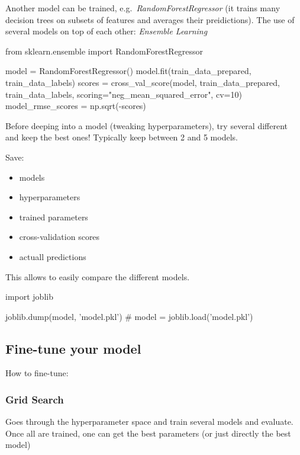 \documentclass{article}
\begin{document}
    Another model can be trained, e.g.\ \emph{RandomForestRegressor} (it trains many decision trees on subsets of features and averages their preidictions).
    The use of several models on top of each other: \emph{Ensemble Learning}
    \begin{python}
        from sklearn.ensemble import RandomForestRegressor

        model = RandomForestRegressor()
        model.fit(train_data_prepared, train_data_labels)
        scores = cross_val_score(model, train_data_prepared, train_data_labels,
                    scoring="neg_mean_squared_error", cv=10)
        model_rmse_scores = np.sqrt(-scores)
    \end{python}

    Before deeping into a model (tweaking hyperparameters), try several different and keep the best ones!
    Typically keep between 2 and 5 models.

    Save:
    \begin{itemize}
        \item models
        \item hyperparameters
        \item trained parameters
        \item cross-validation scores
        \item actuall predictions
    \end{itemize}
    This allows to easily compare the different models.
    \begin{python}
        import joblib

        joblib.dump(model, 'model.pkl')
        # model = joblib.load('model.pkl')
    \end{python}

    \subsection{Fine-tune your model}
    How to fine-tune:
    \subsubsection*{Grid Search}
    Goes through the hyperparameter space and train several models and evaluate.
    Once all are trained, one can get the best parameters (or just directly the best model)
\end{document}
